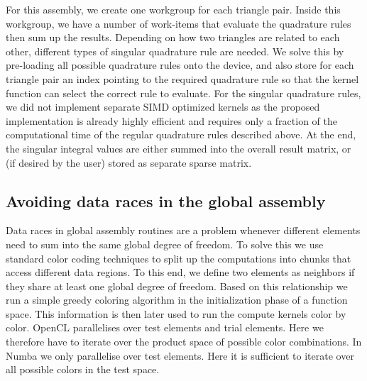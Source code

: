 For this assembly, we create one workgroup for each triangle pair. Inside this workgroup, we have a number of work-items that evaluate the quadrature rules then sum up the results. Depending on how two triangles are related to each other, different types of singular quadrature rule are needed. We solve this by pre-loading all possible quadrature rules onto the device, and also store for each triangle pair an index pointing to the required quadrature rule so that the kernel function can select the correct rule to evaluate. For the singular quadrature rules, we did not implement separate SIMD optimized kernels as the proposed implementation is already highly efficient and requires only a fraction of the computational time of the regular quadrature rules described above. At the end, the singular integral values are either summed into the overall result matrix, or (if desired by the user) stored as separate sparse matrix.

\subsection{Avoiding data races in the global assembly}

Data races in global assembly routines are a problem whenever different elements need to sum into the same global degree of freedom. To solve this we use standard color coding techniques to split up the computations into chunks that access different data regions. To this end, we define two elements as neighbors if they share at least one global degree of freedom. Based on this relationship we run a simple greedy coloring algorithm in the initialization phase of a function space. This information is then later used to run the compute kernels color by color. OpenCL parallelises over test elements and trial elements. Here we therefore have to iterate over the product space of possible color combinations. In Numba we only parallelise over test elements. Here it is sufficient to iterate over all possible colors in the test space.

